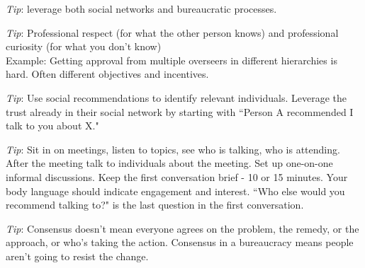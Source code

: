 \textit{Tip}: leverage both social networks and bureaucratic processes. 

\textit{Tip}: Professional respect (for what the other person knows) and professional curiosity (for what you don't know) \\
Example: Getting approval from multiple overseers in different hierarchies is hard. Often different objectives and incentives.

\textit{Tip}: Use social recommendations to identify relevant individuals.
Leverage the trust already in their social network by starting with ``Person A recommended I talk to you about X."

\textit{Tip}: Sit in on meetings, listen to topics, see who is talking, who is attending. After the meeting talk to individuals about the meeting. Set up one-on-one informal discussions. Keep the first conversation  brief - 10 or 15 minutes. Your body language should indicate engagement and interest. ``Who else would you recommend talking to?" is the last question in the first conversation.


\textit{Tip}: Consensus doesn't mean everyone agrees on the problem, the remedy, or the approach, or who's taking the action. Consensus in a bureaucracy means people aren't going to resist the change.